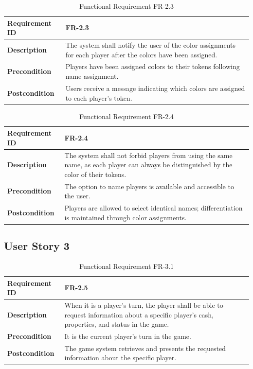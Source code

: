 \documentclass{article}
\begin{document}
\begin{table}[ht]
    \centering
    \caption{Functional Requirement FR-2.3}
    \begin{tabular}{@{}P{3cm}P{12cm}@{}}
        \toprule
        \textbf{Requirement ID} & FR-2.3 \\ \midrule
        \textbf{Description} & The system shall notify the user of the color assignments for each player after the colors have been assigned. \\ \midrule
        \textbf{Precondition} & Players have been assigned colors to their tokens following name assignment. \\ \midrule
        \textbf{Postcondition} & Users receive a message indicating which colors are assigned to each player’s token. \\ \bottomrule
    \end{tabular}
\end{table}

\begin{table}[ht]
    \centering
    \caption{Functional Requirement FR-2.4}
    \begin{tabular}{@{}P{3cm}P{12cm}@{}}
        \toprule
        \textbf{Requirement ID} & FR-2.4 \\ \midrule
        \textbf{Description} & The system shall not forbid players from using the same name, as each player can always be distinguished by the color of their tokens. \\ \midrule
        \textbf{Precondition} & The option to name players is available and accessible to the user. \\ \midrule
        \textbf{Postcondition} & Players are allowed to select identical names; differentiation is maintained through color assignments. \\ \bottomrule
    \end{tabular}
\end{table}

\clearpage
\subsection{User Story 3}

\begin{table}[ht]
    \centering
    \caption{Functional Requirement FR-3.1}
    \begin{tabular}{@{}P{3cm}P{12cm}@{}}
        \toprule
        \textbf{Requirement ID} & FR-2.5 \\ \midrule
        \textbf{Description} & When it is a player’s turn, the player shall be able to request information about a specific player’s cash, properties, and status in the game. \\ \midrule
        \textbf{Precondition} & It is the current player’s turn in the game. \\ \midrule
        \textbf{Postcondition} & The game system retrieves and presents the requested information about the specific player. \\ \bottomrule
    \end{tabular}
\end{table}
\end{document}
